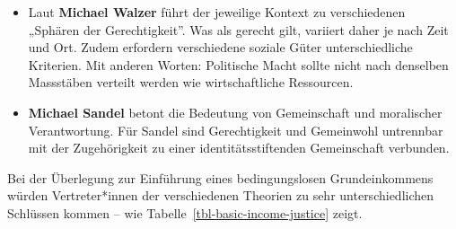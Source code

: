 \documentclass[
  nswissgerman,
  a4paper,
  DIV=11,
  numbers=noendperiod,
  oneside,
  openany]{scrreprt}
\begin{document}
\begin{tcolorbox}
\begin{itemize}
\item
  Laut \textbf{Michael Walzer} führt der jeweilige Kontext zu
  verschiedenen „Sphären der Gerechtigkeit''. Was als gerecht gilt,
  variiert daher je nach Zeit und Ort. Zudem erfordern verschiedene
  soziale Güter unterschiedliche Kriterien. Mit anderen Worten:
  Politische Macht sollte nicht nach denselben Massstäben verteilt
  werden wie wirtschaftliche Ressourcen.
\item
  \textbf{Michael Sandel} betont die Bedeutung von Gemeinschaft und
  moralischer Verantwortung. Für Sandel sind Gerechtigkeit und
  Gemeinwohl untrennbar mit der Zugehörigkeit zu einer
  identitätsstiftenden Gemeinschaft verbunden.
\end{itemize}

\end{tcolorbox}

Bei der Überlegung zur Einführung eines bedingungslosen Grundeinkommens
würden Vertreter*innen der verschiedenen Theorien zu sehr
unterschiedlichen Schlüssen kommen -- wie
Tabelle~\ref{tbl-basic-income-justice} zeigt.

\begingroup\fontsize{9}{11}\selectfont
\end{document}
